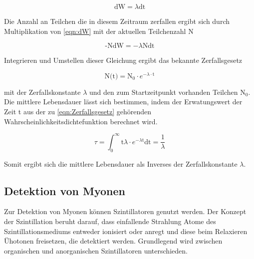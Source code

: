         \begin{equation}
            \text{dW} = \lambda \text{dt}
            \label{eqn:dW}
        \end{equation}

        Die Anzahl an Teilchen die in diesem Zeitraum zerfallen ergibt sich durch Multiplikation von \ref{eqn:dW} mit der aktuellen Teilchenzahl N

        \begin{equation*}
            \text{-NdW} = -\lambda \text{Ndt}
        \end{equation*}

        Integrieren und Umstellen dieser Gleichung ergibt das bekannte Zerfallsgesetz
        
        \begin{equation*}
            \text{N(t)} = \text{N}_0 \cdot e^{- \lambda \cdot \text{t}}
            \label{eqn:Zerfallsgesetz}
        \end{equation*}

        mit der Zerfallskonstante $\lambda$ und den zum Startzeitpunkt vorhanden Teilchen $\text{N}_0$. Die mittlere Lebensdauer lässt sich bestimmen, indem der Erwatungswert der Zeit t aus der zu 
        \ref{eqn:Zerfallsgesetz} gehörenden Wahrscheinlichkeitsdichtefunktion berechnet wird.

        \begin{equation*}
            \tau = \int_0^{\infty} \text{t} \lambda \cdot e^{-\lambda \text{t}} \text{dt} = \frac{1}{\lambda}
            \label{eqn:mittlere_Lebensdauer}
        \end{equation*}

        Somit ergibt sich die mittlere Lebensdauer als Inverses der Zerfallskonstante $\lambda$.

    \subsection{Detektion von Myonen}
        Zur Detektion von Myonen können Szintillatoren genutzt werden. Der Konzept der Szintillation beruht darauf, dass einfallende Strahlung Atome des Szintillationsmediums entweder ionisiert oder anregt und 
        diese beim Relaxieren Ühotonen freisetzen, die detektiert werden. Grundlegend wird zwischen organischen und anorganischen Szintillatoren unterschieden.

